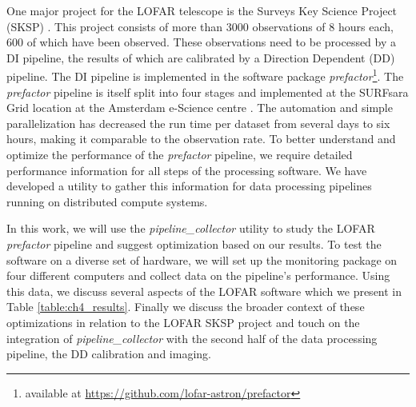 One major project for the LOFAR telescope is the Surveys Key Science Project (SKSP) \citep{lotss}. This project consists of more than 3000 observations of 8 hours each, 600 of which have been observed. These observations need to be processed by a DI pipeline, the results of which are calibrated by a Direction Dependent (DD) pipeline. The DI pipeline is implemented in the software package \textit{prefactor}\footnote{available at \protect\url{https://github.com/lofar-astron/prefactor}}. The \textit{prefactor} pipeline is itself split into four stages and implemented at the SURFsara Grid location at the Amsterdam e-Science centre \citep{SurfSara,mechev17}. The automation and simple parallelization has decreased the run time per dataset from several days to six hours, making it comparable to the observation rate. To better understand and optimize the performance of the \textit{prefactor} pipeline, we require detailed performance information for all steps of the processing software. We have developed a utility to gather this information for data processing pipelines running on distributed compute systems. 

In this work, we will use the \textit{pipeline\_collector} utility to study the LOFAR \textit{prefactor} pipeline and suggest optimization based on our results. To test the software on a diverse set of hardware, we will set up the monitoring package on four different computers and collect data on the pipeline's performance. Using this data, we discuss several aspects of the LOFAR software which we present in Table \ref{table:ch4_results}. Finally we discuss the broader context of these optimizations in relation to the LOFAR SKSP project and touch on the integration of \textit{pipeline\_collector} with the second half of the data processing pipeline, the DD calibration and imaging. 
    
